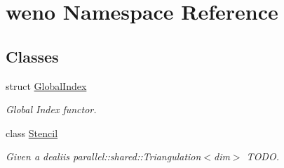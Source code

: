 \hypertarget{namespaceweno}{}\section{weno Namespace Reference}
\label{namespaceweno}
\subsection*{Classes}
\begin{DoxyCompactItemize}
\item 
struct \hyperlink{structweno_1_1_global_index}{Global\+Index}
\begin{DoxyCompactList}\small\item\em Global Index functor. \end{DoxyCompactList}\item 
class \hyperlink{classweno_1_1_stencil}{Stencil}
\begin{DoxyCompactList}\small\item\em Given a dealii\textquotesingle{}s parallel\+::shared\+::\+Triangulation$<$dim$>$ T\+O\+DO. \end{DoxyCompactList}\end{DoxyCompactItemize}
